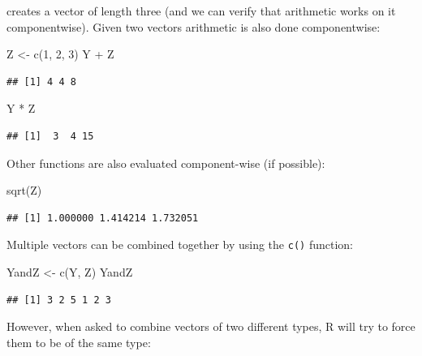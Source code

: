 \documentclass[
]{book}
\newenvironment{Shaded}{\begin{snugshade}}{\end{snugshade}}
\newcommand{\DecValTok}[1]{\textcolor[rgb]{0.00,0.00,0.81}{#1}}
\newcommand{\FunctionTok}[1]{\textcolor[rgb]{0.00,0.00,0.00}{#1}}
\newcommand{\NormalTok}[1]{#1}
\newcommand{\OtherTok}[1]{\textcolor[rgb]{0.56,0.35,0.01}{#1}}
\newcommand{\SpecialCharTok}[1]{\textcolor[rgb]{0.00,0.00,0.00}{#1}}
\begin{document}
creates a vector of length three (and we can verify that arithmetic works on it componentwise). Given two vectors arithmetic is also done componentwise:

\begin{Shaded}
\begin{Highlighting}[]
\NormalTok{Z }\OtherTok{\textless{}{-}} \FunctionTok{c}\NormalTok{(}\DecValTok{1}\NormalTok{, }\DecValTok{2}\NormalTok{, }\DecValTok{3}\NormalTok{)}
\NormalTok{Y }\SpecialCharTok{+}\NormalTok{ Z}
\end{Highlighting}
\end{Shaded}

\begin{verbatim}
## [1] 4 4 8
\end{verbatim}

\begin{Shaded}
\begin{Highlighting}[]
\NormalTok{Y }\SpecialCharTok{*}\NormalTok{ Z}
\end{Highlighting}
\end{Shaded}

\begin{verbatim}
## [1]  3  4 15
\end{verbatim}

Other functions are also evaluated component-wise (if possible):

\begin{Shaded}
\begin{Highlighting}[]
\FunctionTok{sqrt}\NormalTok{(Z)}
\end{Highlighting}
\end{Shaded}

\begin{verbatim}
## [1] 1.000000 1.414214 1.732051
\end{verbatim}

Multiple vectors can be combined together by using the \texttt{c()} function:

\begin{Shaded}
\begin{Highlighting}[]
\NormalTok{YandZ }\OtherTok{\textless{}{-}} \FunctionTok{c}\NormalTok{(Y, Z)}
\NormalTok{YandZ}
\end{Highlighting}
\end{Shaded}

\begin{verbatim}
## [1] 3 2 5 1 2 3
\end{verbatim}

However, when asked to combine vectors of two different types, R will try to force them to be of the same type:
\end{document}
